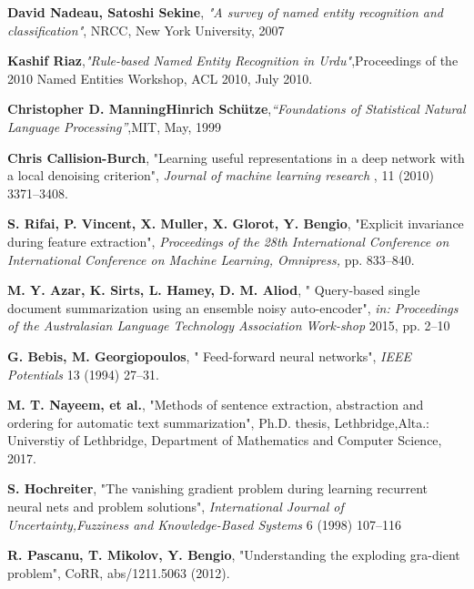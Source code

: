 \documentclass[12pt,a4paper,final]{extreport}
\begin{document}
\newpage
{}
\begin{thebibliography}{}




\textbf{David Nadeau, Satoshi Sekine}, \textit{"A survey of named entity recognition and classification"}, NRCC, New York University, 2007
  
 \textbf{Kashif Riaz},\textit{"Rule-based Named Entity Recognition in Urdu"},Proceedings of the 2010 Named Entities Workshop, ACL 2010, July 2010.

\textbf{Christopher D. Manning}\textbf{Hinrich Schütze},\textit{“Foundations of Statistical Natural Language Processing”},MIT, May, 1999

\textbf{Chris Callision-Burch}, "Learning useful representations in a deep network with a local denoising criterion",\textit{ Journal of machine learning research} , 11 (2010) 3371–3408.

\textbf{S. Rifai, P. Vincent, X. Muller, X. Glorot, Y. Bengio}, "Explicit invariance during feature extraction",   \textit{Proceedings of  the  28th  International  Conference  on  International  Conference  on Machine Learning, Omnipress,} pp. 833–840.

 \textbf{M. Y. Azar, K. Sirts, L. Hamey, D. M. Aliod}, " Query-based single document summarization using an ensemble noisy auto-encoder",  \textit{in:  Proceedings  of  the  Australasian  Language  Technology  Association  Work-shop} 2015, pp. 2–10

\textbf{G. Bebis, M. Georgiopoulos}, " Feed-forward neural networks",  \textit{IEEE Potentials }13 (1994) 27–31.

\textbf{M. T. Nayeem, et al.}, "Methods of sentence extraction, abstraction and ordering  for  automatic  text  summarization",  Ph.D.  thesis,  Lethbridge,Alta.:  Universtiy of Lethbridge, Department of Mathematics and Computer Science, 2017.

\textbf{S. Hochreiter}, "The vanishing gradient problem during learning recurrent neural nets and problem solutions", \textit{International Journal of Uncertainty,Fuzziness and Knowledge-Based Systems} 6 (1998) 107–116

 \textbf{R. Pascanu, T. Mikolov, Y. Bengio},  "Understanding the exploding gra-dient problem",  CoRR, abs/1211.5063 (2012).


  \end{thebibliography}
\end{document}
